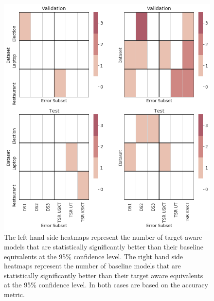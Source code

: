 \begin{figure}[!h]
    \centering
    \includegraphics[scale=0.5]{images/augmentation/methods_performance/Inter_Target/inter_target_split_dataset_heatmaps.png}
    \caption{The left hand side heatmaps represent the number of target aware models that are statistically significantly better than their baseline equivalents at the 95\% confidence level. The right hand side heatmaps represent the number of baseline models that are statistically significantly better than their target aware equivalents at the 95\% confidence level. In both cases are based on the accuracy metric.}
    \label{fig:aug_inter_target_split_dataset_heatmaps}
\end{figure}
